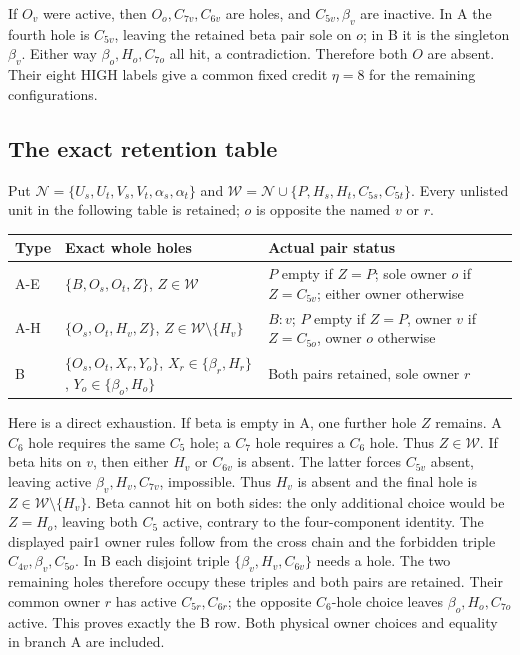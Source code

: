 \documentclass[11pt,letterpaper]{article}
\theoremstyle{definition}\newtheorem{definition}[theorem]{Definition}
\begin{document}
If $O_v$ were active, then $O_o,C_{7v},C_{6v}$ are holes, and $C_{5v},\beta_v$ are inactive. In A the fourth hole is $C_{5v}$, leaving the retained beta pair sole on $o$; in B it is the singleton $\beta_v$. Either way $\beta_o,H_o,C_{7o}$ all hit, a contradiction. Therefore both $O$ are absent. Their eight HIGH labels give a common fixed credit $\eta=8$ for the remaining configurations.

\subsection{The exact retention table}
Put $\mathcal N=\{U_s,U_t,V_s,V_t,\alpha_s,\alpha_t\}$ and
$\mathcal W=\mathcal N\cup\{P,H_s,H_t,C_{5s},C_{5t}\}$.
Every unlisted unit in the following table is retained; $o$ is opposite the named $v$ or $r$.
\begin{center}\small
\begin{tabular}{p{.13\linewidth}p{.40\linewidth}p{.36\linewidth}}
Type&Exact whole holes&Actual pair status\\\hline
A-E&$\{B,O_s,O_t,Z\}$, $Z\in\mathcal W$&$P$ empty if $Z=P$; sole owner $o$ if $Z=C_{5v}$; either owner otherwise\\
A-H&$\{O_s,O_t,H_v,Z\}$, $Z\in\mathcal W\setminus\{H_v\}$&$B:v$; $P$ empty if $Z=P$, owner $v$ if $Z=C_{5o}$, owner $o$ otherwise\\
B&$\{O_s,O_t,X_r,Y_o\}$, $X_r\in\{\beta_r,H_r\}$, $Y_o\in\{\beta_o,H_o\}$&Both pairs retained, sole owner $r$
\end{tabular}
\end{center}
Here is a direct exhaustion. If beta is empty in A, one further hole $Z$ remains. A $C_6$ hole requires the same $C_5$ hole; a $C_7$ hole requires a $C_6$ hole. Thus $Z\in\mathcal W$. If beta hits on $v$, then either $H_v$ or $C_{6v}$ is absent. The latter forces $C_{5v}$ absent, leaving active $\beta_v,H_v,C_{7v}$, impossible. Thus $H_v$ is absent and the final hole is $Z\in\mathcal W\setminus\{H_v\}$. Beta cannot hit on both sides: the only additional choice would be $Z=H_o$, leaving both $C_5$ active, contrary to the four-component identity. The displayed pair1 owner rules follow from the cross chain and the forbidden triple $C_{4v},\beta_v,C_{5o}$.
In B each disjoint triple $\{\beta_v,H_v,C_{6v}\}$ needs a hole. The two remaining holes therefore occupy these triples and both pairs are retained. Their common owner $r$ has active $C_{5r},C_{6r}$; the opposite $C_6$-hole choice leaves $\beta_o,H_o,C_{7o}$ active. This proves exactly the B row. Both physical owner choices and equality in branch A are included.
\end{document}
